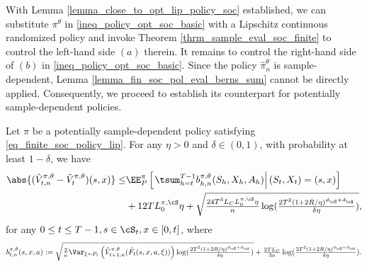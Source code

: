\documentclass[9pt]{article}
\numberwithin{equation}{section}
\begin{document}
With Lemma \ref{lemma_close_to_opt_lip_policy_soc} established, we can substitute $\pi^\theta$ in \eqref{ineq_policy_opt_soc_basic} with a Lipschitz continuous randomized policy and invoke Theorem \ref{thrm_sample_eval_soc_finite} to control the left-hand side $(a)$ therein. It remains to control the right-hand side of $(b)$ in \eqref{ineq_policy_opt_soc_basic}. Since the policy $\hat{\pi}_n^\theta$ is sample-dependent, Lemma \ref{lemma_fin_soc_pol_eval_berns_sum} cannot be directly applied. Consequently, we proceed to establish its counterpart for potentially sample-dependent policies.

\begin{lemma}\label{lemma_fin_soc_pol_opt_bern_rad}
    Let $\pi$ be a potentially sample-dependent policy satisfying \eqref{eq_finite_soc_policy_lip}. For any $\eta > 0$ and $\delta \in (0,1)$, with probability at least $1-\delta$, we have
    \begin{align}
        \abs{(\hat{V}_{t,n}^{\pi, \theta} - \tilde{V}_t^{\pi, \theta})(s,x)} \leq & \EE_{P}^\pi \left[\left. \tsum_{h=t}^{T-1} b_{h,n}^{\pi, \theta}(S_h, X_h, A_h) \right| (S_t, X_t) = (s,x) \right] \nonumber \\
        & + 12TL_0^{\pi, \cS} \eta + \sqrt{\tfrac{24T^3L_C L_0^{\pi, \cS} \eta }{n}\log(\tfrac{2T^2 (1 + 2R/\eta)^{d_\cS + d_\cA}}{\delta \eta})},\nonumber
    \end{align}
    for any $0 \leq t \leq T-1, s \in \cS_t, x \in [0,t]$, where
    \begin{align}
        b_{t,n}^{\pi, \theta}(s,x,a) := \sqrt{ \tfrac{2}{n} \Var_{\xi \sim P_t} \left(\hat{V}_{t+1,n}^{\pi, \theta}(\tilde{F}_t(s,x,a,\xi))\right) \log(\tfrac{2T^2 (1 + 2R/\eta)^{d_\cS + d_\cA}}{\delta \eta})} + \tfrac{2TL_C}{3n} \log(\tfrac{2T^2(1 + 2R/\eta)^{d_\cS + d_\cA}}{\delta \eta}). \nonumber
    \end{align}
\end{lemma}
\end{document}
